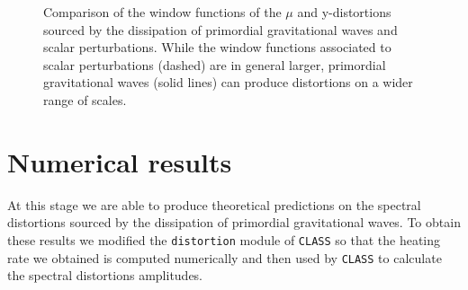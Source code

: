 \begin{figure}
    \centering
{}
\caption{Comparison of the window functions of the $\mu$ and y-distortions sourced by the dissipation of primordial gravitational waves and scalar perturbations. While the window functions associated to scalar perturbations (dashed) are in general larger, primordial gravitational waves (solid lines) can produce distortions on a wider range of scales.}
\label{fig:st_window}
\end{figure}

\section{Numerical results}
At this stage we are able to produce theoretical predictions on the spectral distortions sourced by the dissipation of primordial gravitational waves. To obtain these results we modified the \texttt{distortion} module of \texttt{CLASS} so that the heating rate we obtained is computed numerically and then used by \texttt{CLASS} to calculate the spectral distortions amplitudes.


